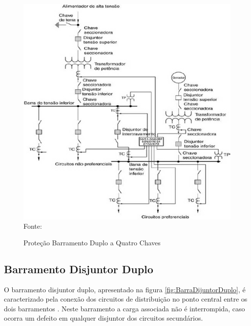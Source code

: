 \begin{figure}[!htb] 
    \centering
    \caption{Proteção Barramento Duplo a Quatro Chaves}
    \includegraphics[scale = .8]{figuras/BarraComGeracaoAuxiliar.png}
    \\ Fonte: \cite{mamede2000protecao}
    \label{fig:BarraDupla4Chaves}
\end{figure}


\newpage

\subsection{Barramento Disjuntor Duplo}

O barramento disjuntor duplo, apresentado na figura \ref{fig:BarraDijuntorDuplo}, é caracterizado pela conexão dos circuitos de distribuição no ponto central entre
os dois barramentos \cite{mamede2000protecao}. Neste barramento a carga associada não é interrompida, caso ocorra um defeito em qualquer disjuntor dos circuitos secundários. 

